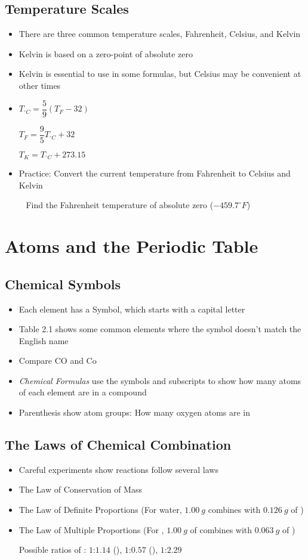 \documentclass[12pt, openany, letterpaper]{memoir}
\begin{document}
\section{Temperature Scales}
\begin{itemize}
	\item There are three common temperature scales, Fahrenheit, Celsius, and Kelvin
	\item Kelvin is based on a zero-point of absolute zero
	\item Kelvin is essential to use in some formulas, but Celsius may be convenient at other times
	\item $T_{^\circ C}=\dfrac{5}{9}\left(T_F-32\right)$

	      $T_F=\dfrac{9}{5}T_{^\circ C}+32$

	      $T_K=T_{^\circ C}+273.15$

	\item Practice: Convert the current temperature from Fahrenheit to Celsius and Kelvin

	      ~\hphantom{Practice:} Find the Fahrenheit temperature of absolute zero ($-459.7^\circ F$)
\end{itemize}

\chapter{Atoms and the Periodic Table}
\section{Chemical Symbols}
\begin{itemize}
	\item Each element has a Symbol, which starts with a capital letter
  \item Table 2.1 shows some common elements where the symbol doesn't match the English name
  \item Compare CO and Co
	\item \emph{Chemical Formulas} use the symbols and subscripts to show how many atoms of each element are in a compound
	\item Parenthesis show atom groups: How many oxygen atoms are in 
\end{itemize}
\section{The Laws of Chemical Combination}
\begin{itemize}
	\item Careful experiments show reactions follow several laws
	\item The Law of Conservation of Mass
	\item The Law of Definite Proportions (For water, $1.00~g$  combines with $0.126~g$ of )
	\item The Law of Multiple Proportions (For , $1.00~g$ of  combines with $0.063~g$ of )

	      Possible ratios of : $1$:$1.14$ (), $1$:$0.57$ (), $1$:$2.29$ 
\end{itemize}
\end{document}

